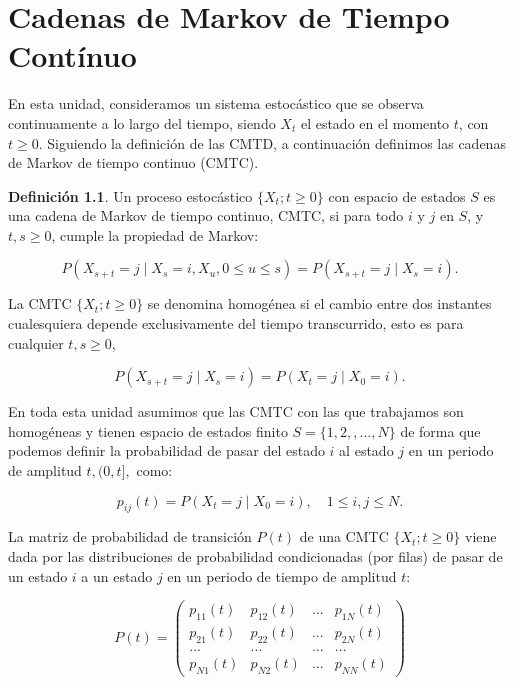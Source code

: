 \documentclass[
]{book}
\newenvironment{yellowbox}{
  \definecolor{shadecolor}{rgb}{210, 180, 140}  
  \color{black}
  \begin{shaded}}
 {\end{shaded}}
\theoremstyle{definition}
\newtheorem{definition}{Definición}[chapter]
\theoremstyle{definition}
\theoremstyle{definition}
\theoremstyle{definition}
\theoremstyle{remark}
\begin{document}
\hypertarget{CMTC}{%
\chapter{Cadenas de Markov de Tiempo Contínuo}\label{CMTC}}

En esta unidad, consideramos un sistema estocástico que se observa continuamente a lo largo del tiempo, siendo \(X_t\) el estado en el momento \(t\), con \(t \geq 0\). Siguiendo la definición de las CMTD, a continuación definimos las cadenas de Markov de tiempo continuo (CMTC).

\begin{yellowbox}

\begin{definition}
\protect\hypertarget{def:cmtc001}{}\label{def:cmtc001}Un proceso estocástico \(\{X_t; t \geq 0\}\) con espacio de estados \(S\) es una cadena de Markov de tiempo continuo, CMTC, si para todo \(i\) y \(j\) en \(S\), y \(t, s \geq 0\), cumple la propiedad de Markov:

\[P(X_{s+t} = j \mid X_s = i, X_u, 0 \leq u \leq s) = P(X_{s+t} = j \mid X_s = i).\]
\end{definition}

\end{yellowbox}

La CMTC \(\{X_t; t \geq 0\}\) se denomina homogénea si el cambio entre dos instantes cualesquiera depende exclusivamente del tiempo transcurrido, esto es para cualquier \(t, s \geq 0\),

\[P(X_{s+t} = j \mid X_s = i) = P(X_t = j \mid X_0 = i).\]

En toda esta unidad asumimos que las CMTC con las que trabajamos son homogéneas y tienen espacio de estados finito \(S=\{1, 2,,...,N\}\) de forma que podemos definir la probabilidad de pasar del estado \(i\) al estado \(j\) en un periodo de amplitud \(t, (0,t],\) como:

\[p_{ij}(t) = P(X_t = j \mid X_0 = i), \quad 1 \leq i, j \leq N.\]

La matriz de probabilidad de transición \(P(t)\) de una CMTC \(\{X_t; t \geq 0\}\) viene dada por las distribuciones de probabilidad condicionadas (por filas) de pasar de un estado \(i\) a un estado \(j\) en un periodo de tiempo de amplitud \(t\):

\[P(t) = 
\begin{pmatrix}
p_{11}(t) & p_{12}(t) & ... & p_{1N}(t)\\
p_{21}(t) & p_{22}(t) & ... & p_{2N}(t)\\
... & ... & ... & ...\\
p_{N1}(t) & p_{N2}(t) & ... & p_{NN}(t)
\end{pmatrix}\]
\end{document}
